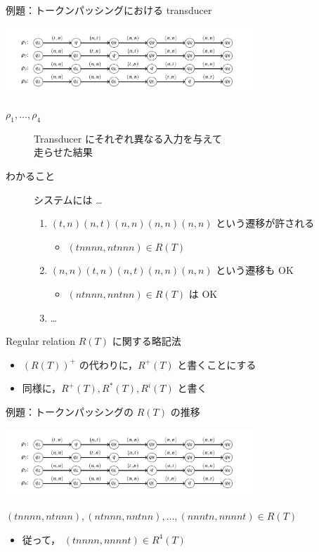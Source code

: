 \documentclass[presentation, xetex]{beamer}
\begin{document}
\begin{frame}[label={sec:orgc1e176b}]{例題：トークンパッシングにおける transducer}
\begin{center}
\includegraphics[width=0.7\textwidth]{./images/four-transducer.png}
\end{center}


\begin{description}
\item[{\(\rho_1, \dots, \rho_4\)}] Transducer にそれぞれ異なる入力を与えて\\
走らせた結果
\item[{わかること}] システムには \dots{}
\begin{enumerate}
\item \((t, n)(n, t)(n, n)(n, n)(n, n)\) という遷移が許される
\begin{itemize}
\item \((tnnnn, ntnnn) \in R(T)\)
\end{itemize}
\item \((n, n)(t, n)(n, t)(n, n)(n, n)\) という遷移も OK
\begin{itemize}
\item \((ntnnn, nntnn) \in R(T)\) は OK
\end{itemize}
\item \dots{}
\end{enumerate}
\end{description}
\end{frame}


\begin{frame}[label={sec:orgf4bb823}]{Regular relation \(R(T)\) に関する略記法}
\begin{itemize}
\item \((R(T))^+\) の代わりに，\(R^+(T)\) と書くことにする
\item 同様に，\(R^+(T), R^*(T), R^i(T)\) と書く
\end{itemize}
\end{frame}


\begin{frame}[label={sec:org871aaf8}]{例題：トークンパッシングの \(R(T)\) の推移}
\begin{center}
\includegraphics[width=0.7\textwidth]{./images/four-transducer.png}
\end{center}

\((tnnnn, ntnnn), (ntnnn, nntnn), \dots, (nnntn, nnnnt) \in R(T)\)
\begin{itemize}
\item 従って， \((tnnnn, nnnnt) \in R^4(T)\)
\end{itemize}
\end{frame}
\end{document}
